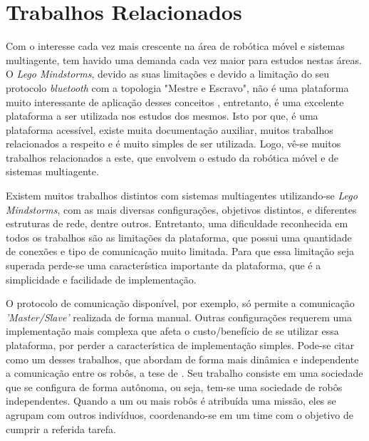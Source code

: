 %
%
\chapter{Trabalhos Relacionados}
\label{chap:trabalhosRelacionados}
Com o interesse cada vez mais crescente na área de robótica móvel e sistemas multiagente, tem havido uma demanda cada vez maior para estudos nestas áreas. O \emph{Lego Mindstorms\textregistered}, devido as suas limitações e devido a limitação do seu protocolo \emph{bluetooth} com a topologia "Mestre e Escravo", não é uma plataforma muito interessante de aplicação desses conceitos , entretanto, é uma excelente plataforma a ser utilizada nos estudos dos mesmos. Isto por que, é uma plataforma acessível, existe muita documentação auxiliar, muitos trabalhos relacionados a respeito e é muito simples de ser utilizada. Logo, vê-se muitos trabalhos relacionados a este, que envolvem o estudo da robótica móvel e de sistemas multiagente.

Existem muitos trabalhos distintos com sistemas multiagentes utilizando-se \emph{Lego Mindstorms\textregistered}, com as mais diversas configurações, objetivos distintos, e diferentes estruturas de rede, dentre outros. Entretanto, uma dificuldade reconhecida em todos os trabalhos são as limitações da plataforma, que possui uma quantidade de conexões e tipo de comunicação muito limitada. Para que essa limitação seja superada perde-se uma característica importante da plataforma, que é a simplicidade e facilidade de implementação. 

O protocolo de comunicação disponível, por exemplo, só permite a comunicação \emph{'Master/Slave'} realizada de forma manual. Outras configurações requerem uma implementação mais complexa que afeta o custo/benefício de se utilizar essa plataforma, por perder a característica de implementação simples. Pode-se citar como um desses trabalhos, que abordam de forma mais dinâmica e independente a comunicação entre os robôs, a tese de . Seu trabalho consiste em uma sociedade que se configura de forma autônoma, ou seja, tem-se uma sociedade de robôs independentes. Quando a um ou mais robôs é atribuída uma missão, eles se agrupam com outros indivíduos, coordenando-se em um time com o objetivo de cumprir a referida tarefa. %

